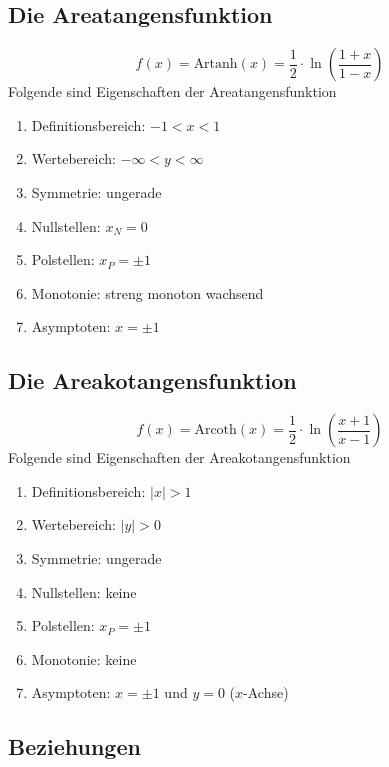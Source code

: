\subsection{Die Areatangensfunktion}
\begin{equation}
\boxed{f\left(x\right)=\text{Artanh}\left(x\right)=\dfrac{1}{2}\cdot \ln\left(\dfrac{1+x}{1-x}\right)}
\end{equation}
Folgende sind Eigenschaften der Areatangensfunktion
\begin{enumerate}[$(a)$]
\item Definitionsbereich: $-1<x<1$
\item Wertebereich: $-\infty<y<\infty$
\item Symmetrie: ungerade
\item Nullstellen: $x_N=0$
\item Polstellen: $x_P=\pm 1$
\item Monotonie: streng monoton wachsend
\item Asymptoten: $x=\pm 1$ 
\end{enumerate}
\subsection{Die Areakotangensfunktion}
\begin{equation}
\boxed{f\left(x\right)=\text{Arcoth}\left(x\right)=\dfrac{1}{2}\cdot \ln\left(\dfrac{x+1}{x-1}\right)}
\end{equation}
Folgende sind Eigenschaften der Areakotangensfunktion
\begin{enumerate}[$(a)$]
\item Definitionsbereich: $\Big\vert x\Big\vert> 1$
\item Wertebereich: $\Big\vert y\Big\vert>0$
\item Symmetrie: ungerade
\item Nullstellen: keine
\item Polstellen: $x_P=\pm 1$
\item Monotonie: keine
\item Asymptoten: $x=\pm 1$ und $y=0$ ($x$-Achse) 
\end{enumerate}
\subsection{Beziehungen}
